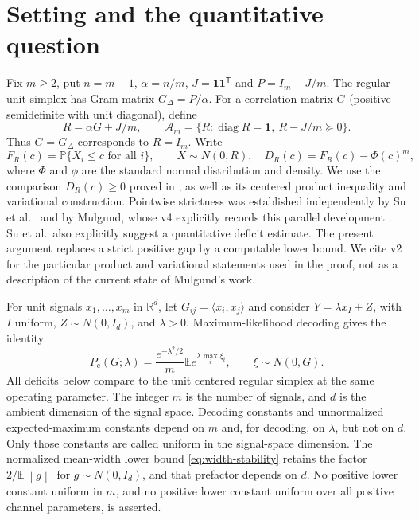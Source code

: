 \documentclass[11pt]{article}
\theoremstyle{remark}\newtheorem{remark}[theorem]{Remark}
\newcommand{\R}{\mathbb R}
\newcommand{\E}{\mathbb E}
\newcommand{\Pp}{\mathbb P}
\newcommand{\one}{\mathbf 1}
\newcommand{\diag}{\operatorname{diag}}
\newcommand{\norm}[1]{\left\lVert#1\right\rVert}
\newcommand{\Pc}{P_{\mathrm c}}
\begin{document}
\section{Setting and the quantitative question}
Fix $m\ge2$, put $n=m-1$, $\alpha=n/m$, $J=\one\one^{\mathsf T}$ and
$P=I_m-J/m$. The regular unit simplex has Gram matrix $G_\Delta=P/\alpha$.
For a correlation matrix $G$ (positive semidefinite with unit diagonal), define
\begin{equation}\label{eq:normalization}
 R=\alpha G+J/m,\qquad
 \mathcal A_m=\{R:\diag R=\one,\ R-J/m\succeq0\}.
\end{equation}
Thus $G=G_\Delta$ corresponds to $R=I_m$. Write
\[
 F_R(c)=\Pp\{X_i\le c\text{ for all }i\},\qquad X\sim N(0,R),
 \quad D_R(c)=F_R(c)-\Phi(c)^m,
\]
where $\Phi$ and $\phi$ are the standard normal distribution and density.
We use the comparison $D_R(c)\ge0$ proved in \cite{Mulgund}, as well as its
centered product inequality and variational construction. Pointwise strictness was established independently by Su et al.\ \cite{Su}
and by Mulgund, whose v4 explicitly records this parallel development
\cite[Remark 2.3 and Appendix B]{MulgundLatest}. Su et al.\ also explicitly
suggest a quantitative deficit estimate. The present argument replaces a
strict positive gap by a computable lower bound. We cite v2 for the particular
product and variational statements used in the proof, not as a description
of the current state of Mulgund's work.

For unit signals $x_1,\ldots,x_m$ in $\R^d$, let $G_{ij}=\langle x_i,x_j\rangle$
and consider $Y=\lambda x_I+Z$, with $I$ uniform, $Z\sim N(0,I_d)$, and $\lambda>0$.
Maximum-likelihood decoding gives the identity
\begin{equation}\label{eq:pc}
 \Pc(G;\lambda)=\frac{e^{-\lambda^2/2}}m
       \E e^{\lambda\max_i\xi_i},\qquad \xi\sim N(0,G).
\end{equation}
All deficits below compare to the unit centered regular simplex at the same
operating parameter. The integer $m$ is the number of signals, and $d$ is the
ambient dimension of the signal space. Decoding constants and unnormalized
expected-maximum constants depend on $m$ and, for decoding, on $\lambda$, but
not on $d$. Only those constants are called uniform in the signal-space
dimension. The normalized mean-width lower bound \eqref{eq:width-stability}
retains the factor $2/\E\norm g$ for $g\sim N(0,I_d)$, and that prefactor
depends on $d$. No positive lower constant uniform in $m$, and no positive
lower constant uniform over all positive channel parameters, is asserted.
\end{document}
